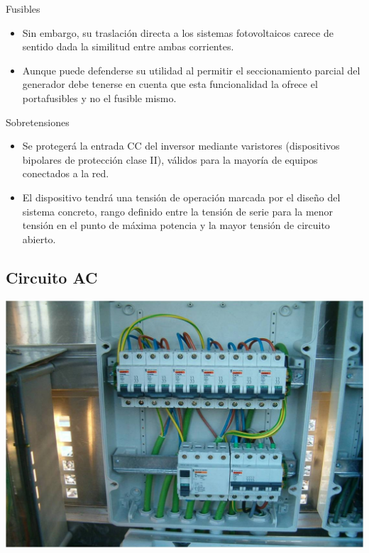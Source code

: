 \documentclass[xcolor={usenames,svgnames,dvipsnames}]{beamer}
\begin{document}
\begin{frame}[label=sec-5-1-9]{Fusibles}
\begin{itemize}
\item Sin embargo, su traslación directa a los sistemas fotovoltaicos
carece de sentido dada la similitud entre ambas corrientes.

\item Aunque puede defenderse su utilidad al permitir el seccionamiento
parcial del generador debe tenerse en cuenta que esta funcionalidad
la ofrece el portafusibles y no el fusible mismo.
\end{itemize}
\end{frame}

\begin{frame}[label=sec-5-1-10]{Sobretensiones}
\begin{itemize}
\item Se protegerá la entrada CC del inversor mediante \alert{varistores}
(dispositivos bipolares de protección clase II), válidos para la
mayoría de equipos conectados a la red.

\item El dispositivo tendrá una tensión de operación marcada por el diseño
del sistema concreto, rango definido entre la tensión de serie para
la menor tensión en el punto de máxima potencia y la mayor tensión de
circuito abierto.
\end{itemize}
\end{frame}

\subsection{Circuito AC}
\label{sec-5-2}

\begin{frame}[label=sec-5-2-1]{}
\includegraphics[width=.9\linewidth]{../figs/CajaAC.jpg}
\end{frame}
\end{document}
